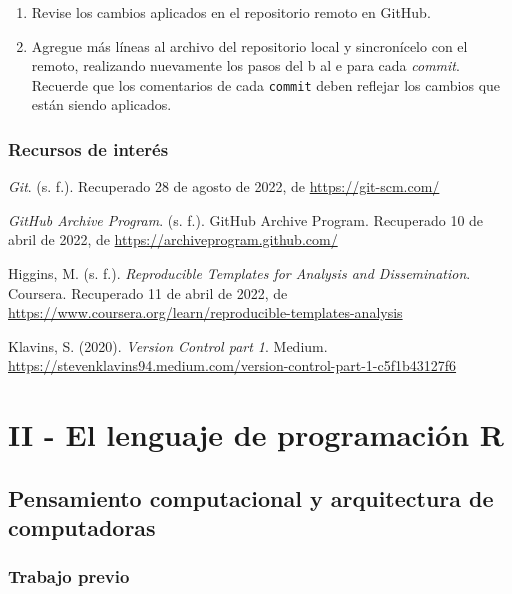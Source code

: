 \documentclass[
  letterpaper,
  DIV=11,
  numbers=noendperiod]{scrreprt}
\providecommand{\tightlist}{%
  \setlength{\itemsep}{0pt}\setlength{\parskip}{0pt}}\usepackage{longtable,booktabs,array}
\begin{document}
\begin{enumerate}
\def\labelenumi{\arabic{enumi}.}
\setcounter{enumi}{4}
\tightlist
\item
  Revise los cambios aplicados en el repositorio remoto en GitHub.
\item
  Agregue más líneas al archivo del repositorio local y sincronícelo con
  el remoto, realizando nuevamente los pasos del b al e para cada
  \emph{commit}. Recuerde que los comentarios de cada \texttt{commit}
  deben reflejar los cambios que están siendo aplicados.
\end{enumerate}

\hypertarget{recursos-de-interuxe9s-1}{%
\section{Recursos de interés}\label{recursos-de-interuxe9s-1}}

\emph{Git}. (s. f.). Recuperado 28 de agosto de 2022, de
\url{https://git-scm.com/}

\emph{GitHub Archive Program}. (s. f.). GitHub Archive Program.
Recuperado 10 de abril de 2022, de
\url{https://archiveprogram.github.com/}

Higgins, M. (s. f.). \emph{Reproducible Templates for Analysis and
Dissemination}. Coursera. Recuperado 11 de abril de 2022, de
\url{https://www.coursera.org/learn/reproducible-templates-analysis}

Klavins, S. (2020). \emph{Version Control part 1}. Medium.
\url{https://stevenklavins94.medium.com/version-control-part-1-c5f1b43127f6}

\part{II - El lenguaje de programación R}

\hypertarget{pensamiento-computacional-y-arquitectura-de-computadoras}{%
\chapter{Pensamiento computacional y arquitectura de
computadoras}\label{pensamiento-computacional-y-arquitectura-de-computadoras}}

\hypertarget{trabajo-previo-3}{%
\section{Trabajo previo}\label{trabajo-previo-3}}
\end{document}
